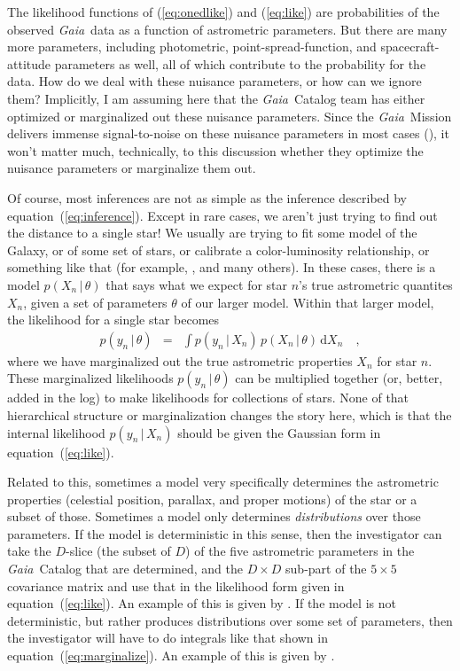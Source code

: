 \documentclass[12pt, modern]{aastex62h}
\newcommand{\Gaia}{\textsl{Gaia}}
\newcommand{\equationname}{equation}
\newcommand{\dd}{\mathrm{d}}
\newcommand{\given}{\,|\,}
\begin{document}
The likelihood functions of (\ref{eq:onedlike}) and (\ref{eq:like}) are
probabilities of the observed \Gaia\ data as a
function of astrometric parameters.
But there are many more parameters, including photometric, point-spread-function,
and spacecraft-attitude parameters as well, all of which contribute to the probability
for the data.
How do we deal with these nuisance parameters, or how can we ignore them?
Implicitly, I am assuming here that the \Gaia\ Catalog team has either optimized
or marginalized out these nuisance parameters.
Since the \Gaia\ Mission delivers immense signal-to-noise on these nuisance
parameters in most cases (\citealt{holl}), it won't matter much, technically, to this
discussion whether they optimize
the nuisance parameters or marginalize them out.

Of course, most inferences are not as simple as the inference described by
\equationname~(\ref{eq:inference}).
Except in rare cases, we aren't just trying to find out the distance to a single
star!
We usually are trying to fit some model of the Galaxy, or of some set of stars,
or calibrate a color-luminosity relationship, or something like that
(for example, \citealt{sesar, hawkins, leistedt, oh, delgado, widmark, anderson}, and many others).
In these cases, there is a model $p(X_n\given\theta)$ that says what we expect
for star $n$'s true astrometric quantites $X_n$, given a set of parameters $\theta$
of our larger model.
Within that larger model, the likelihood for a single star becomes
\begin{eqnarray}
p(y_n\given\theta) &=& \int p(y_n\given X_n)\,p(X_n\given\theta)\,\dd X_n
\label{eq:marginalize}
\quad ,
\end{eqnarray}
where we have marginalized out the true astrometric properties $X_n$ for star $n$.
These marginalized likelihoods $p(y_n\given\theta)$
can be multiplied together (or, better, added in the log)
to make likelihoods for collections of stars.
None of that hierarchical structure or marginalization changes the story here,
which is that the internal likelihood $p(y_n\given X_n)$ should be given the
Gaussian form in \equationname~(\ref{eq:like}).

Related to this, sometimes a model very specifically determines the
astrometric properties (celestial position, parallax, and proper
motions) of the star or a subset of those. Sometimes a model only
determines \emph{distributions} over those parameters.
If the model is deterministic in this sense, then the investigator can take
the $D$-slice (the subset of $D$) of the five astrometric parameters
in the \Gaia\ Catalog that are determined,
and the $D\times D$ sub-part of the $5\times 5$ covariance matrix
and use that in the likelihood form given in \equationname~(\ref{eq:like}).
An example of this is given by \citet{tri2}.
If the model is not deterministic, but rather produces distributions
over some set of parameters, then the investigator will have to do integrals
like that shown in \equationname~(\ref{eq:marginalize}).
An example of this is given by \citet{oh}.
\end{document}
